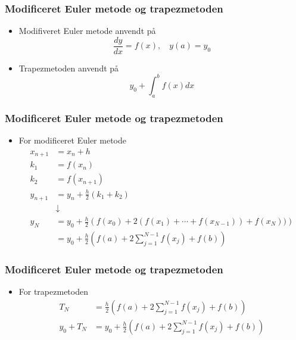\begin{frame}
\frametitle{Modificeret Euler metode og \phantom{HHHHHHH} trapezmetoden}
\begin{itemize}
\item Modifiveret Euler metode anvendt på $$\frac{dy}{dx}=f(x),\phantom{hi}y(a)=y_0$$
\item Trapezmetoden anvendt på $$y_0 + \int_a^b f(x) dx$$
\end{itemize}
\end{frame}
%
\begin{frame}
\frametitle{Modificeret Euler metode og \phantom{HHHHHHH} trapezmetoden}
\begin{itemize}
\item For modificeret Euler metode
\begin{align*}
x_{n+1} &= x_n + h\\
k_1 &= f(x_n)\\
k_2 &= f(x_{n+1} )\\
y_{n+1} &= y_n + \frac{h}{2}(k_1 + k_2)\\
&\downarrow\\
y_N &= y_0 + \frac{h}{2}\left( f(x_0) + 2(f(x_1) + \cdots + f(x_{N-1})) + f(x_N) ) \right)\\
 &= y_0 + \frac{h}{2}\left(f(a) + 2\sum_{j=1}^{N-1}f(x_j) + f(b)\right)
\end{align*}
\end{itemize}
\end{frame}
%
\begin{frame}
\frametitle{Modificeret Euler metode og \phantom{HHHHHHH} trapezmetoden}
\begin{itemize}
\item For trapezmetoden
\begin{align*}
T_N &= \frac{h}{2} \left(f(a) + 2\sum_{j=1}^{N-1} f(x_j) + f(b) \right)\\
y_0 + T_N  &= y_0 + \frac{h}{2} \left(f(a) + 2\sum_{j=1}^{N-1} f(x_j) + f(b) \right)
\end{align*}
\end{itemize}
\end{frame}